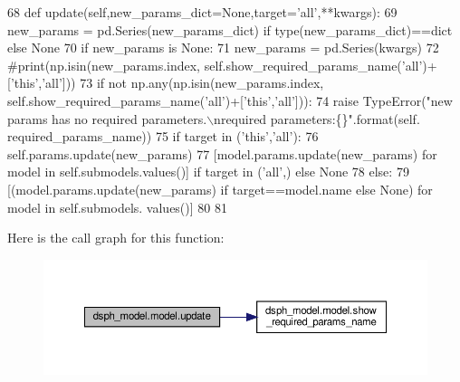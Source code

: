 \begin{DoxyCode}
68     \textcolor{keyword}{def }update(self,new\_params\_dict=None,target='all',**kwargs):
69         new\_params = pd.Series(new\_params\_dict) \textcolor{keywordflow}{if} type(new\_params\_dict)==dict \textcolor{keywordflow}{else} \textcolor{keywordtype}{None}
70         \textcolor{keywordflow}{if} new\_params \textcolor{keywordflow}{is} \textcolor{keywordtype}{None}:
71             new\_params = pd.Series(kwargs)
72         \textcolor{comment}{#print(np.isin(new\_params.index, self.show\_required\_params\_name('all')+['this','all']))}
73         \textcolor{keywordflow}{if} \textcolor{keywordflow}{not} np.any(np.isin(new\_params.index, self.show\_required\_params\_name(\textcolor{stringliteral}{'all'})+[\textcolor{stringliteral}{'this'},\textcolor{stringliteral}{'all'}])):
74             \textcolor{keywordflow}{raise} TypeError(\textcolor{stringliteral}{"new params has no required parameters.\(\backslash\)nrequired parameters:\{\}"}.format(self.
      required\_params\_name))
75         \textcolor{keywordflow}{if} target \textcolor{keywordflow}{in} (\textcolor{stringliteral}{'this'},\textcolor{stringliteral}{'all'}):
76             self.params.update(new\_params)
77             [model.params.update(new\_params) \textcolor{keywordflow}{for} model \textcolor{keywordflow}{in} self.submodels.values()] \textcolor{keywordflow}{if} target \textcolor{keywordflow}{in} (\textcolor{stringliteral}{'all'},) \textcolor{keywordflow}{
      else} \textcolor{keywordtype}{None}
78         \textcolor{keywordflow}{else}:
79             [(model.params.update(new\_params) \textcolor{keywordflow}{if} target==model.name \textcolor{keywordflow}{else} \textcolor{keywordtype}{None}) \textcolor{keywordflow}{for} model \textcolor{keywordflow}{in} self.submodels.
      values()]
80 
81 
\end{DoxyCode}
Here is the call graph for this function\+:\nopagebreak
\begin{figure}[H]
\begin{center}
\leavevmode
\includegraphics[width=350pt]{d3/da3/classdsph__model_1_1model_a80a9ec2a3ea7ead926e609f6e3d316f0_cgraph}
\end{center}
\end{figure}


